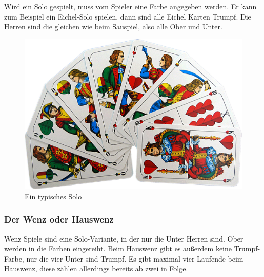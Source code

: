 \documentclass[
							a4paper, 
							11pt, 
							openany, 
							liststotoc,
							parskip=half, 
   							headings=normal
						]{scrreprt}
\begin{document}
{Wird ein Solo gespielt, muss vom Spieler eine Farbe angegeben werden. Er kann zum Beispiel ein Eichel-Solo spielen, dann sind alle Eichel Karten Trumpf.
Die Herren sind die gleichen wie beim Sauspiel, also alle Ober und Unter.

\cite[S.25-28]{merschbacher:schafkopf}

\begin{figure}[H]
\begin{center}
    \includegraphics[width=1.0\textwidth]{./pictures/cards/solo.jpg}
	\caption[Schafkopf -- Ein typisches Solo]{Ein typisches Solo} \label{fig:schafkopf_karten_solo}
\end{center}
\end{figure}

\clearpage

\subsubsection{Der Wenz oder Hauswenz} \label{ssse:grundlagen_schafkopf_regeln_wenz}
Wenz Spiele sind eine Solo-Variante, in der nur die Unter Herren sind. Ober werden in die Farben eingereiht. Beim Hauswenz gibt es außerdem keine Trumpf-Farbe, nur die vier Unter sind Trumpf. Es gibt maximal vier Laufende beim Hauswenz, diese zählen allerdings bereits ab zwei in Folge. \cite[S.28f.]{merschbacher:schafkopf}

}
\end{document}
